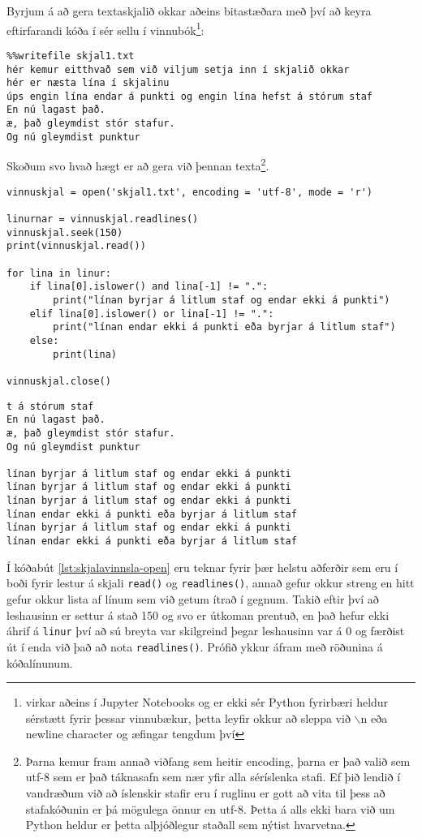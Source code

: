 Byrjum á að gera textaskjalið okkar aðeins bitastæðara með því að keyra eftirfarandi kóða í sér sellu í vinnubók\footnote{virkar aðeins í Jupyter Notebooks og er ekki sér Python fyrirbæri heldur sérstætt fyrir þessar vinnubækur, þetta leyfir okkur að sleppa við $\backslash$n eða newline character og æfingar tengdum því}:
\begin{verbatim}
%%writefile skjal1.txt
hér kemur eitthvað sem við viljum setja inn í skjalið okkar
hér er næsta lína í skjalinu
úps engin lína endar á punkti og engin lína hefst á stórum staf
En nú lagast það.
æ, það gleymdist stór stafur.
Og nú gleymdist punktur
\end{verbatim}

Skoðum svo hvað hægt er að gera við þennan texta\footnote{Þarna kemur fram annað viðfang sem heitir encoding, þarna er það valið sem utf-8 sem er það táknasafn sem nær yfir alla séríslenka stafi. Ef þið lendið í vandræðum við að íslenskir stafir eru í ruglinu er gott að vita til þess að stafakóðunin er þá mögulega önnur en utf-8. Þetta á alls ekki bara við um Python heldur er þetta alþjóðlegur staðall sem nýtist hvarvetna.}.

\begin{lstlisting}[caption=Hér sjáum við einfalda skjalavinnslu, label=lst:skjalavinnsla-open]
vinnuskjal = open('skjal1.txt', encoding = 'utf-8', mode = 'r')	

linurnar = vinnuskjal.readlines()
vinnuskjal.seek(150)
print(vinnuskjal.read())

for lina in linur:
	if lina[0].islower() and lina[-1] != ".":
		print("línan byrjar á litlum staf og endar ekki á punkti")
	elif lina[0].islower() or lina[-1] != ".":
		print("línan endar ekki á punkti eða byrjar á litlum staf")
	else:
		print(lina)

vinnuskjal.close()
\end{lstlisting}
\lstset{style=uttak}
\begin{lstlisting}
t á stórum staf
En nú lagast það.
æ, það gleymdist stór stafur.
Og nú gleymdist punktur

línan byrjar á litlum staf og endar ekki á punkti
línan byrjar á litlum staf og endar ekki á punkti
línan byrjar á litlum staf og endar ekki á punkti
línan endar ekki á punkti eða byrjar á litlum staf
línan byrjar á litlum staf og endar ekki á punkti
línan endar ekki á punkti eða byrjar á litlum staf
\end{lstlisting}
\lstset{style=venjulegt}

Í kóðabút \ref{lst:skjalavinnsla-open} eru teknar fyrir þær helstu aðferðir sem eru í boði fyrir lestur á skjali \texttt{read()} og \texttt{readlines()}, annað gefur okkur streng en hitt gefur okkur lista af línum sem við getum ítrað í gegnum.
Takið eftir því að leshausinn er settur á stað 150 og svo er útkoman prentuð, en það hefur ekki áhrif á \texttt{linur} því að sú breyta var skilgreind þegar leshausinn var á 0 og færðist út í enda við það að nota \texttt{readlines()}.
Prófið ykkur áfram með röðunina á kóðalínunum.
 
